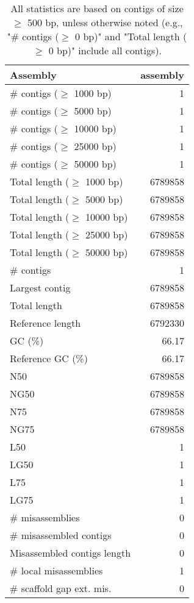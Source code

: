 \documentclass[12pt,a4paper]{article}
\begin{document}
\begin{table}[ht]
\begin{center}
\caption{All statistics are based on contigs of size $\geq$ 500 bp, unless otherwise noted (e.g., "\# contigs ($\geq$ 0 bp)" and "Total length ($\geq$ 0 bp)" include all contigs).}
\begin{tabular}{|l*{1}{|r}|}
\hline
Assembly & assembly \\ \hline
\# contigs ($\geq$ 1000 bp) & 1 \\ \hline
\# contigs ($\geq$ 5000 bp) & 1 \\ \hline
\# contigs ($\geq$ 10000 bp) & 1 \\ \hline
\# contigs ($\geq$ 25000 bp) & 1 \\ \hline
\# contigs ($\geq$ 50000 bp) & 1 \\ \hline
Total length ($\geq$ 1000 bp) & 6789858 \\ \hline
Total length ($\geq$ 5000 bp) & 6789858 \\ \hline
Total length ($\geq$ 10000 bp) & 6789858 \\ \hline
Total length ($\geq$ 25000 bp) & 6789858 \\ \hline
Total length ($\geq$ 50000 bp) & 6789858 \\ \hline
\# contigs & 1 \\ \hline
Largest contig & 6789858 \\ \hline
Total length & 6789858 \\ \hline
Reference length & 6792330 \\ \hline
GC (\%) & 66.17 \\ \hline
Reference GC (\%) & 66.17 \\ \hline
N50 & 6789858 \\ \hline
NG50 & 6789858 \\ \hline
N75 & 6789858 \\ \hline
NG75 & 6789858 \\ \hline
L50 & 1 \\ \hline
LG50 & 1 \\ \hline
L75 & 1 \\ \hline
LG75 & 1 \\ \hline
\# misassemblies & 0 \\ \hline
\# misassembled contigs & 0 \\ \hline
Misassembled contigs length & 0 \\ \hline
\# local misassemblies & 1 \\ \hline
\# scaffold gap ext. mis. & 0 \\ \hline

\end{tabular}
\end{center}
\end{table}
\end{document}
